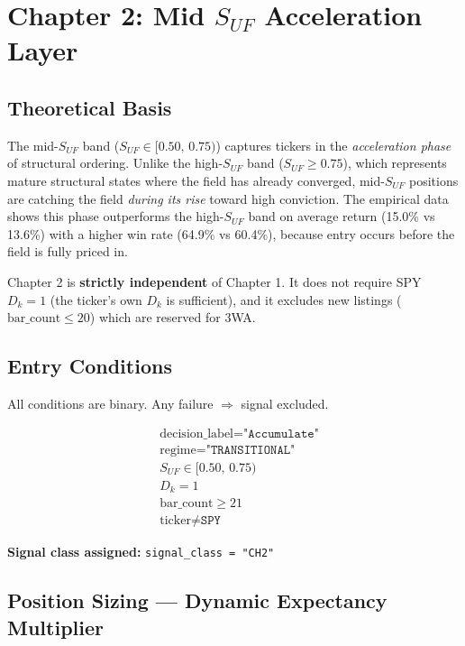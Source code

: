 \documentclass[11pt, a4paper]{article}
\begin{document}
\section{Chapter 2: Mid $S_{UF}$ Acceleration Layer}

\subsection{Theoretical Basis}

The mid-$S_{UF}$ band ($S_{UF} \in [0.50,\, 0.75)$) captures tickers in the
\textit{acceleration phase} of structural ordering. Unlike the high-$S_{UF}$ band
($S_{UF} \geq 0.75$), which represents mature structural states where the field has
already converged, mid-$S_{UF}$ positions are catching the field \textit{during its
rise} toward high conviction. The empirical data shows this phase outperforms the
high-$S_{UF}$ band on average return (15.0\% vs 13.6\%) with a higher win rate
(64.9\% vs 60.4\%), because entry occurs before the field is fully priced in.

Chapter 2 is \textbf{strictly independent} of Chapter 1. It does not require SPY
$D_k = 1$ (the ticker's own $D_k$ is sufficient), and it excludes new listings
($\text{bar\_count} \leq 20$) which are reserved for 3WA.

\subsection{Entry Conditions}

All conditions are binary. Any failure $\Rightarrow$ signal excluded.

\begin{align}
  &\text{decision\_label} = \texttt{"Accumulate"} \label{eq:ch2-1}\\
  &\text{regime} = \texttt{"TRANSITIONAL"} \label{eq:ch2-2}\\
  &S_{UF} \in [0.50,\, 0.75) \label{eq:ch2-3}\\
  &D_k = 1 \label{eq:ch2-4}\\
  &\text{bar\_count} \geq 21 \label{eq:ch2-5}\\
  &\text{ticker} \neq \texttt{SPY} \label{eq:ch2-6}
\end{align}

\textbf{Signal class assigned:} \texttt{signal\_class = "CH2"}

\subsection{Position Sizing — Dynamic Expectancy Multiplier}
\end{document}
